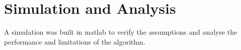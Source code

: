 
\def\chapdir{./ChapterExperiments}

\chapter{Simulation and Analysis}\label{ch:experiments}

A simulation was built in matlab to verify the assumptions and analyse the performance and limitations of the algorithm.












